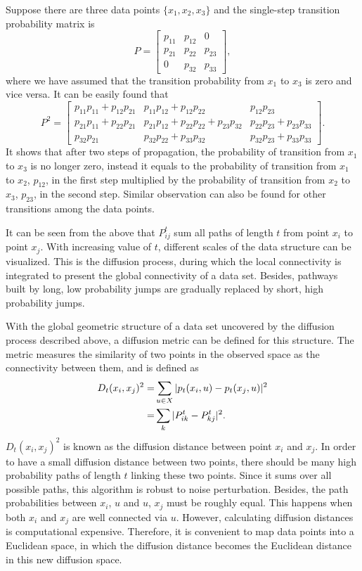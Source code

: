 Suppose there are three data points $\{x_1, x_2, x_3\}$ and the single-step transition probability matrix is
\begin{equation}
  P=\begin{bmatrix}
	p_{11} & p_{12} & 0\\
	p_{21} & p_{22} & p_{23} \\
	0      & p_{32} & p_{33}
\end{bmatrix},
\end{equation}
where we have assumed that the transition probability from $x_1$ to $x_3$ is zero and vice versa. It can be easily found that
\begin{equation}
  P^2=
  \begin{bmatrix}
  	p_{11}p_{11}+p_{12}p_{21} & p_{11}p_{12}+p_{12}p_{22} & p_{12}p_{23}\\
  	p_{21}p_{11}+p_{22}p_{21} & p_{21}p_{12}+p_{22}p_{22}+p_{23}p_{32} & p_{22}p_{23}+p_{23}p_{33} \\
  	p_{32}p_{21}      & p_{32}p_{22}+p_{33}p_{32} & p_{32}p_{23}+p_{33}p_{33}
  \end{bmatrix}.
\end{equation}
It shows that after two steps of propagation, the probability of transition from $x_1$ to $x_3$ is no longer zero, instead it equals to the probability of transition from $x_1$ to $x_2$, $p_{12}$, in the first step multiplied by the probability of transition from $x_2$ to $x_3$, $p_{23}$, in the second step. Similar observation can also be found for other transitions among the data points.

It can be seen from the above that $P^t_{ij}$ sum all paths of length $t$ from point $x_i$ to point $x_j$. With increasing value of $t$, different scales of the data structure can be visualized. This is the diffusion process, during which the local connectivity is integrated to present the global connectivity of a data set. Besides, pathways built by long, low probability jumps are gradually replaced by short, high probability jumps. 

With the global geometric structure of a data set uncovered by the diffusion process described above, a diffusion metric can be defined for this structure. The metric measures the similarity of two points in the observed space as the connectivity between them, and is defined as
\begin{align}
	D_t(x_i,x_j)^2=&\sum_{u\in X}|p_t(x_i,u)-p_t(x_j,u)|^2\notag\\
	              =&\sum_k |P_{ik}^t-P_{kj}^t|^2.
\end{align}
$D_t(x_i,x_j)^2$ is known as the diffusion distance between point $x_i$ and $x_j$. In order to have a small diffusion distance between two points, there should be many high probability paths of length $t$ linking these two points. Since it sums over all possible paths, this algorithm is robust to noise perturbation. Besides, the path probabilities between $x_i$, $u$ and $u$, $x_j$ must be roughly equal. This happens when both $x_i$ and $x_j$ are well connected via $u$. However, calculating diffusion distances is computational expensive. Therefore, it is convenient to map data points into a Euclidean space, in which the diffusion distance becomes the Euclidean distance in this new diffusion space. 

